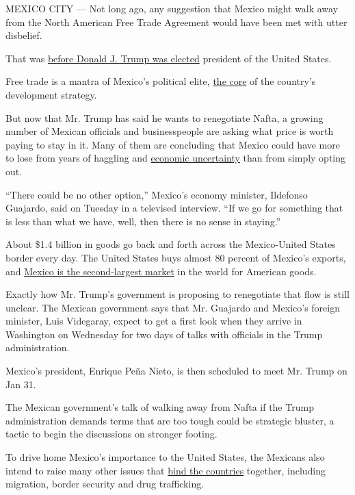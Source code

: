 MEXICO CITY --- Not long ago, any suggestion that Mexico might walk away
from the North American Free Trade Agreement would have been met with
utter disbelief.

That was
\href{https://www.nytimes3xbfgragh.onion/2016/11/10/world/americas/mexico-donald-trump-peso.html}{before
Donald J. Trump was elected} president of the United States.

Free trade is a mantra of Mexico's political elite,
\href{https://www.nytimes3xbfgragh.onion/2017/01/04/world/americas/mexico-donald-trump-nafta.html}{the
core} of the country's development strategy.

But now that Mr. Trump has said he wants to renegotiate Nafta, a growing
number of Mexican officials and businesspeople are asking what price is
worth paying to stay in it. Many of them are concluding that Mexico
could have more to lose from years of haggling and
\href{https://www.nytimes3xbfgragh.onion/2016/11/27/world/americas/mexico-oil-pemex-donald-trump.html}{economic
uncertainty} than from simply opting out.

``There could be no other option,'' Mexico's economy minister, Ildefonso
Guajardo, said on Tuesday in a televised interview. ``If we go for
something that is less than what we have, well, then there is no sense
in staying.''

About \$1.4 billion in goods go back and forth across the Mexico-United
States border every day. The United States buys almost 80 percent of
Mexico's exports, and
\href{https://www.census.gov/foreign-trade/statistics/highlights/top/top1611yr.html}{Mexico
is the second-largest market} in the world for American goods.

Exactly how Mr. Trump's government is proposing to renegotiate that flow
is still unclear. The Mexican government says that Mr. Guajardo and
Mexico's foreign minister, Luis Videgaray, expect to get a first look
when they arrive in Washington on Wednesday for two days of talks with
officials in the Trump administration.

Mexico's president, Enrique Peña Nieto, is then scheduled to meet Mr.
Trump on Jan 31.

The Mexican government's talk of walking away from Nafta if the Trump
administration demands terms that are too tough could be strategic
bluster, a tactic to begin the discussions on stronger footing.

To drive home Mexico's importance to the United States, the Mexicans
also intend to raise many other issues that
\href{https://www.nytimes3xbfgragh.onion/2017/01/23/world/americas/trump-pena-nieto-mexico-meeting.html}{bind
the countries} together, including migration, border security and drug
trafficking.

